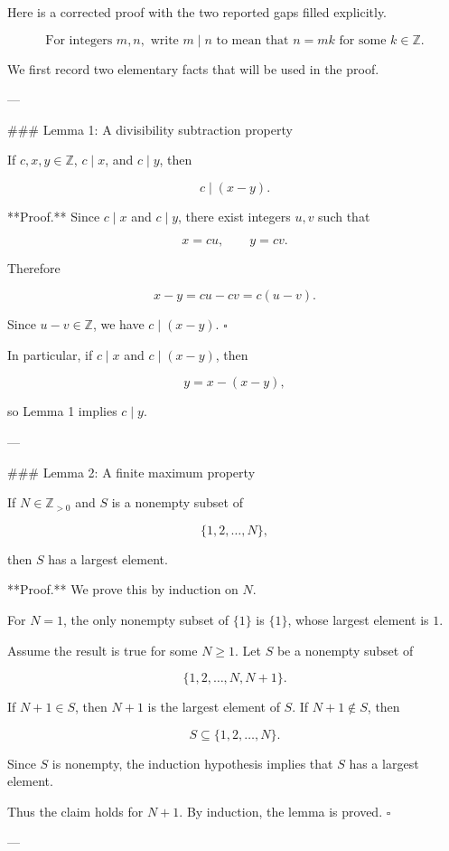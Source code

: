 Here is a corrected proof with the two reported gaps filled explicitly.

\[
\text{For integers } m,n,\text{ write } m\mid n \text{ to mean that } n=mk
\text{ for some } k\in\mathbb Z.
\]

We first record two elementary facts that will be used in the proof.

---

### Lemma 1: A divisibility subtraction property

If \(c,x,y\in\mathbb Z\), \(c\mid x\), and \(c\mid y\), then

\[
c\mid (x-y).
\]

**Proof.** Since \(c\mid x\) and \(c\mid y\), there exist integers \(u,v\) such that

\[
x=cu,\qquad y=cv.
\]

Therefore

\[
x-y=cu-cv=c(u-v).
\]

Since \(u-v\in\mathbb Z\), we have \(c\mid (x-y)\). \(\square\)

In particular, if \(c\mid x\) and \(c\mid (x-y)\), then

\[
y=x-(x-y),
\]

so Lemma 1 implies \(c\mid y\).

---

### Lemma 2: A finite maximum property

If \(N\in\mathbb Z_{>0}\) and \(S\) is a nonempty subset of

\[
\{1,2,\dots,N\},
\]

then \(S\) has a largest element.

**Proof.** We prove this by induction on \(N\).

For \(N=1\), the only nonempty subset of \(\{1\}\) is \(\{1\}\), whose largest element is \(1\).

Assume the result is true for some \(N\ge 1\). Let \(S\) be a nonempty subset of

\[
\{1,2,\dots,N,N+1\}.
\]

If \(N+1\in S\), then \(N+1\) is the largest element of \(S\). If \(N+1\notin S\), then

\[
S\subseteq \{1,2,\dots,N\}.
\]

Since \(S\) is nonempty, the induction hypothesis implies that \(S\) has a largest element.

Thus the claim holds for \(N+1\). By induction, the lemma is proved. \(\square\)

---

